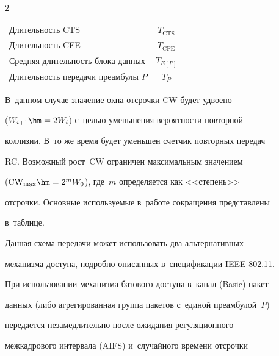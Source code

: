 \begin{multicols}{2}
{\begin{center}
\begin{tabular}{|l|c|}
Длительность CTS&$T_{\mathrm{CTS}}$\\


Длительность CFE&$T_{\mathrm{CFE}}$\\


Средняя длительность блока данных&$T_{E[P]}$\\


Длительность передачи преамбулы $P$&$T_P$\\


\hline


\end{tabular}


\end{center}}





\vspace*{18pt}







\noindent 


В~данном случае значение окна отсрочки CW будет удвоено 


($W_{i+1}\hm= 2W_i$) с~целью уменьшения вероятности повторной 


коллизии. В~то же время будет уменьшен счетчик повторных передач 


RC. Возможный рост~CW ограничен максимальным значением 


($\mathrm{CW}_{\max}\hm= 2^mW_0$), где~$m$ определяется как <<степень>> 


отсрочки. Основные используемые в~работе сокращения представлены 


в~таблице.


    





    


    Данная схема передачи может использовать два альтернативных 


механизма доступа, подробно описанных в~спецификации IEEE 802.11. 


При использовании механизма базового доступа в~канал (Basic) пакет 


данных (либо агрегированная группа пакетов с~единой преамбулой~$P$) 


передается незамедлительно после ожидания регуляционного 


межкадрового интервала (AIFS) и~случайного времени отсрочки 



\end{multicols}
